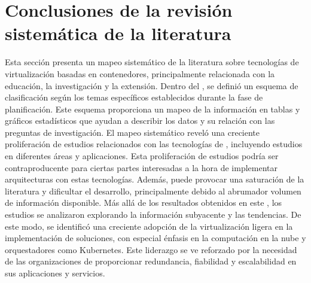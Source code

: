 \section{Conclusiones de la revisión sistemática de la literatura}
\noindent
Esta sección presenta un mapeo sistemático de la literatura sobre tecnologías de virtualización basadas en contenedores, principalmente relacionada con la educación, la investigación y la extensión. Dentro del \SMS, se definió un esquema de clasificación según los temas específicos establecidos durante la fase de planificación. Este esquema proporciona un mapeo de la información en tablas y gráficos estadísticos que ayudan a describir los datos y su relación con las preguntas de investigación. El mapeo sistemático reveló una creciente proliferación de estudios relacionados con las tecnologías de \VBC, incluyendo estudios en diferentes áreas y aplicaciones. Esta proliferación de estudios podría ser contraproducente para ciertas partes interesadas a la hora de implementar arquitecturas con estas tecnologías. Además, puede provocar una saturación de la literatura y dificultar el desarrollo, principalmente debido al abrumador volumen de información disponible. Más allá de los resultados obtenidos en este \SMS, los estudios se analizaron explorando la información subyacente y las tendencias. De este modo, se identificó una creciente adopción de la virtualización ligera en la implementación de soluciones, con especial énfasis en la computación en la nube y orquestadores como Kubernetes. Este liderazgo se ve reforzado por la necesidad de las organizaciones de proporcionar redundancia, fiabilidad y escalabilidad en sus aplicaciones y servicios.